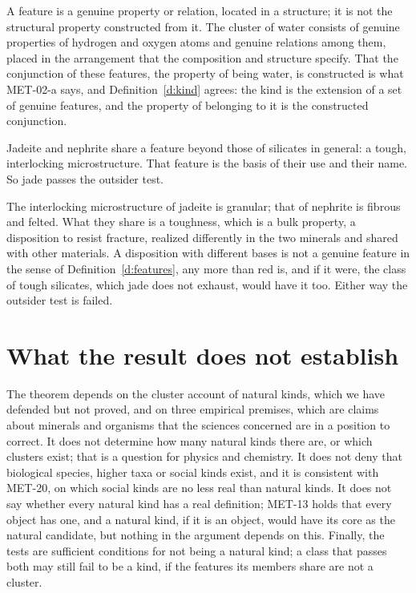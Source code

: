 \documentclass{situationist-preprint}
\begin{document}
\begin{reply}
A feature is a genuine property or relation, located in a structure; it is not the structural property constructed from it. The cluster of water consists of genuine properties of hydrogen and oxygen atoms and genuine relations among them, placed in the arrangement that the composition and structure specify. That the conjunction of these features, the property of being water, is constructed is what MET-02-a says, and Definition~\ref{d:kind} agrees: the kind is the extension of a set of genuine features, and the property of belonging to it is the constructed conjunction.
\end{reply}

\begin{objection}\label{o:jade}
Jadeite and nephrite share a feature beyond those of silicates in general: a tough, interlocking microstructure. That feature is the basis of their use and their name. So jade passes the outsider test.
\end{objection}

\begin{reply}
The interlocking microstructure of jadeite is granular; that of nephrite is fibrous and felted. What they share is a toughness, which is a bulk property, a disposition to resist fracture, realized differently in the two minerals and shared with other materials. A disposition with different bases is not a genuine feature in the sense of Definition~\ref{d:features}, any more than red is, and if it were, the class of tough silicates, which jade does not exhaust, would have it too. Either way the outsider test is failed.
\end{reply}

\section{What the result does not establish}\label{s:limits}

The theorem depends on the cluster account of natural kinds, which we have defended but not proved, and on three empirical premises, which are claims about minerals and organisms that the sciences concerned are in a position to correct. It does not determine how many natural kinds there are, or which clusters exist; that is a question for physics and chemistry. It does not deny that biological species, higher taxa or social kinds exist, and it is consistent with MET-20, on which social kinds are no less real than natural kinds. It does not say whether every natural kind has a real definition; MET-13 holds that every object has one, and a natural kind, if it is an object, would have its core as the natural candidate, but nothing in the argument depends on this. Finally, the tests are sufficient conditions for not being a natural kind; a class that passes both may still fail to be a kind, if the features its members share are not a cluster.
\end{document}
